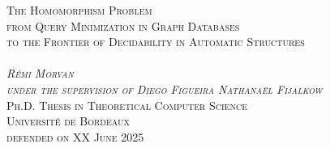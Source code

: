 \begin{titlepage}
\begin{center}
  \Huge\scshape{%
  The Homomorphism Problem}\\[.5cm]
  \Large\scshape{%
  from Query Minimization in Graph Databases\\[.2cm]to the Frontier of Decidability in Automatic Structures}\\
  \vspace{5cm}
  \\
  \vfill
  \normalfont%
  \huge{}\emph{Rémi Morvan}\\
  \large\emph{under the supervision of 
  Diego Figueira {\color{maincolor}\fancyand} Nathanaël Fijalkow}\\[1cm]
  \normalfont\Large\scshape
  Ph.D. Thesis in Theoretical Computer Science\\
  \textcolor{maincolor}{Université de Bordeaux}\\
  defended on XX June 2025
\end{center}
\end{titlepage}
\restoregeometry